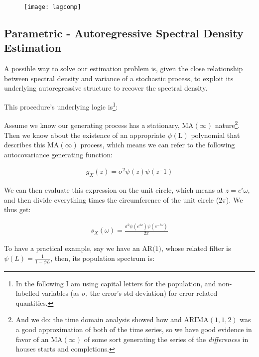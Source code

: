 \documentclass[12pt]{article} %
\begin{document}
\begin{figure}[h!]
\begin{center}
\texttt{[image: lagcomp]}
\caption{}
\end{center}
\end{figure}


\subsection{Parametric - Autoregressive Spectral Density Estimation}

A possible way to solve our estimation problem is, given the close relationship between spectral density and variance of a stochastic process, to exploit its underlying autoregressive structure to recover the spectral density. 

This procedure's underlying logic is\footnote{In the following I am using capital letters for the population, and non-labelled variables (as $\sigma$, the error's std deviation) for error related quantities.}: 

Assume we know our generating process has a stationary, $\text{MA}(\infty)$ nature\footnote{
And we do: the time domain analysis showed how and $\text{ARIMA}(1,1,2)$ was a good approximation of both of the time series, so we have good evidence in favor of an $\text{MA}(\infty)$ of some sort generating the series of the {\em differences} in houses starts and completions.}. Then we know about the existence of an appropriate $\psi(\text{L})$ polynomial that describes this $\text{MA}(\infty)$ process, which means we can refer to the following autocovariance generating function:

\begin{equation}
\begin{aligned}
g_X(z)=\sigma^2\psi(z)\psi(z^-1)
\end{aligned}
\end{equation}

We can then evaluate this expression on the unit circle, which means at $z=e^i\omega$, and then divide everything times the circumference of the unit circle ($2\pi$). We thus get:

\begin{equation}
\begin{aligned}
s_X(\omega)=\frac{\sigma^2\psi(e^{i\omega})\psi(e^{-i\omega})}{2\pi}
\end{aligned}
\end{equation}

To have a practical example, say we have an $\text{AR(1)}$, whose related filter is $\psi(L)=\frac{1}{1-\phi L}$, then, its population spectrum is:
\end{document}
